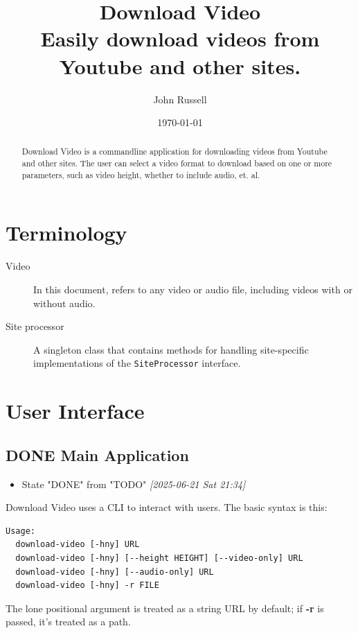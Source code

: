 \documentclass[11pt]{report}
\author{John Russell}
\date{\today}
\title{Download Video\\\medskip
\large Easily download videos from Youtube and other sites.}
\begin{document}
\maketitle
\tableofcontents

\begin{abstract}
Download Video is a commandline application for downloading videos from
Youtube and other sites.  The user can select a video format to download based
on one or more parameters, such as video height, whether to include audio,
et. al.
\end{abstract}

\part{Terminology}
\label{sec:org6e52071}

\begin{description}
\item[{Video}] In this document, refers to any video or audio file, including videos
with or without audio.
\item[{Site processor}] A singleton class that contains methods for handling
site-specific implementations of the \texttt{SiteProcessor} interface.
\end{description}

\part{User Interface}
\label{sec:org6668f97}

\chapter{{\bfseries\sffamily DONE} Main Application}
\label{sec:org224afe8}
\begin{itemize}
\item State "DONE"       from "TODO"       \textit{[2025-06-21 Sat 21:34]}
\end{itemize}
Download Video uses a CLI to interact with users.  The basic syntax is this:

\begin{verbatim}
Usage:
  download-video [-hny] URL
  download-video [-hny] [--height HEIGHT] [--video-only] URL
  download-video [-hny] [--audio-only] URL
  download-video [-hny] -r FILE
\end{verbatim}

The lone positional argument is treated as a string URL by default; if \textbf{-r} is
passed, it's treated as a path.
\end{document}
